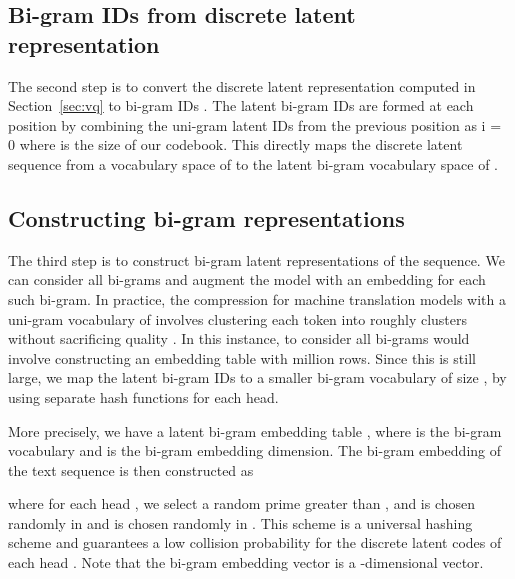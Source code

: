 \documentclass[11pt]{article}
\begin{document}
\subsection{Bi-gram IDs from discrete latent 
representation}\label{sec:compute-bigram}
The second step is to convert the discrete latent 
representation  
computed in Section~\ref{sec:vq} to bi-gram IDs . The latent 
bi-gram IDs are formed at each
position by combining the uni-gram latent IDs  from the previous position as
i = 0
where  is the size of our codebook. 
This directly maps the discrete latent sequence from  a vocabulary space of  to the
latent bi-gram vocabulary space of .

\subsection{Constructing bi-gram representations}\label{sec:bigram} 
The third step is to construct bi-gram latent 
representations  of
the sequence. We can consider all  bi-grams and 
augment the model with an embedding for each such bi-gram. 
In practice, the compression for machine translation 
models with a  uni-gram vocabulary of  involves 
clustering each token into 
roughly  
clusters without sacrificing quality \citep{kaiser2018fast, roy2018theory}. 
In this instance, to consider all bi-grams would involve 
constructing an embedding table with  
million rows. Since this is still large, we map the latent
bi-gram IDs to a smaller bi-gram vocabulary of size ,
by using separate hash functions for each head.

More precisely, we have a latent bi-gram embedding table
, 
where  is the bi-gram vocabulary and  is
the bi-gram embedding dimension. The bi-gram embedding 
 of the text sequence
is then constructed as 

where for each head , we select a random prime  greater than , 
and  is chosen randomly in  and
 is chosen randomly in . 
This scheme is a universal hashing scheme and
guarantees a low collision probability for the discrete
latent codes of each head \citep{thorup2015high}.
Note that the bi-gram embedding vector  is a -dimensional vector. 
\end{document}
